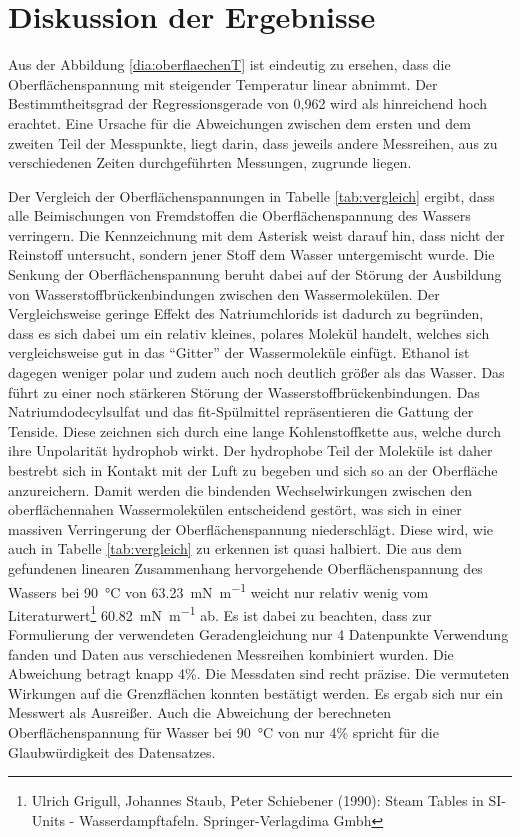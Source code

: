 \section{Diskussion der Ergebnisse}
\label{sec:diskussion}
Aus der Abbildung \ref{dia:oberflaechenT} ist eindeutig zu ersehen, dass die Oberflächenspannung mit steigender Temperatur linear abnimmt. Der Bestimmtheitsgrad der Regressionsgerade von 0,962 wird als hinreichend hoch erachtet. Eine Ursache für die Abweichungen zwischen dem ersten und dem zweiten Teil der Messpunkte, liegt darin, dass jeweils andere Messreihen, aus zu verschiedenen Zeiten durchgeführten Messungen, zugrunde liegen.




Der Vergleich der Oberflächenspannungen in Tabelle \ref{tab:vergleich} ergibt, dass alle Beimischungen von Fremdstoffen die Oberflächenspannung des Wassers verringern. Die Kennzeichnung mit dem Asterisk weist darauf hin, dass nicht der Reinstoff untersucht, sondern jener Stoff dem Wasser untergemischt wurde. Die Senkung der Oberflächenspannung beruht dabei auf der Störung der Ausbildung von Wasserstoffbrückenbindungen zwischen den Wassermolekülen. Der Vergleichsweise geringe Effekt des Natriumchlorids ist dadurch zu begründen, dass es sich dabei um ein relativ kleines, polares Molekül handelt, welches sich vergleichsweise gut in das "`Gitter"' der Wassermoleküle einfügt. Ethanol ist dagegen weniger polar und zudem auch noch deutlich größer als das Wasser. Das führt zu einer noch stärkeren Störung der Wasserstoffbrückenbindungen. 
Das Natriumdodecylsulfat und das fit-Spülmittel repräsentieren die Gattung der Tenside. Diese zeichnen sich durch eine lange Kohlenstoffkette aus, welche durch ihre Unpolarität hydrophob wirkt. Der hydrophobe Teil der Moleküle ist daher bestrebt sich in Kontakt mit der Luft zu begeben und sich so an der Oberfläche anzureichern. Damit werden die bindenden Wechselwirkungen zwischen den oberflächennahen Wassermolekülen entscheidend gestört, was sich in einer massiven Verringerung der Oberflächenspannung niederschlägt. Diese wird, wie auch in Tabelle \ref{tab:vergleich} zu erkennen ist quasi halbiert.
\vspace{3mm}
Die aus dem gefundenen linearen Zusammenhang hervorgehende Oberflächenspannung des Wassers bei \SI{90}{\degreeCelsius} von \SI{63,23}{\milli\newton\per\meter} weicht nur relativ wenig vom Literaturwert\footnote{Ulrich Grigull, Johannes Staub, Peter Schiebener (1990): Steam Tables in SI-Units - Wasserdampftafeln. Springer-Verlagdima Gmbh } \SI{60,82}{\milli\newton\per\meter} ab. Es ist dabei zu beachten, dass zur Formulierung der verwendeten Geradengleichung nur 4 Datenpunkte Verwendung fanden und Daten aus verschiedenen Messreihen kombiniert wurden. Die Abweichung betragt knapp 4\%. 
\vspace{3mm}
Die Messdaten sind recht präzise. Die vermuteten Wirkungen auf die Grenzflächen konnten bestätigt werden. Es ergab sich nur ein Messwert als Ausreißer. Auch die Abweichung der berechneten Oberflächenspannung für Wasser bei \SI{90}{\degreeCelsius} von nur 4\% spricht für die Glaubwürdigkeit des Datensatzes.

